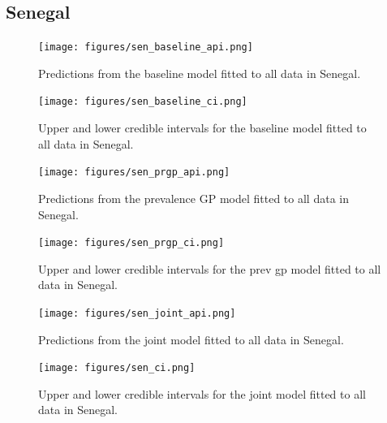 \documentclass[10pt,a4]{article}
\begin{document}
\subsection{Senegal}


\begin{figure}[h!]
\centering

\texttt{[image: figures/sen\_baseline\_api.png]}

\caption{Predictions from the baseline model fitted to all data in Senegal.}
\label{baselinesen}
\end{figure}


\begin{figure}[h!]
\centering

\texttt{[image: figures/sen\_baseline\_ci.png]}

\caption{Upper and lower credible intervals for the baseline model fitted to all data in Senegal.}
\label{basesenci}
\end{figure}





\begin{figure}[h!]
\centering

\texttt{[image: figures/sen\_prgp\_api.png]}

\caption{Predictions from the prevalence GP model fitted to all data in Senegal.}
\label{gpsen}
\end{figure}



\begin{figure}[h!]
\centering

\texttt{[image: figures/sen\_prgp\_ci.png]}

\caption{Upper and lower credible intervals for the prev gp model fitted to all data in Senegal.}
\label{prgpsenci}
\end{figure}



\begin{figure}[h!]
\centering

\texttt{[image: figures/sen\_joint\_api.png]}

\caption{Predictions from the joint model fitted to all data in Senegal.}
\label{jointsen}
\end{figure}


\begin{figure}[h!]
\centering

\texttt{[image: figures/sen\_ci.png]}

\caption{Upper and lower credible intervals for the joint model fitted to all data in Senegal.}
\label{jointsenci}
\end{figure}
\end{document}
